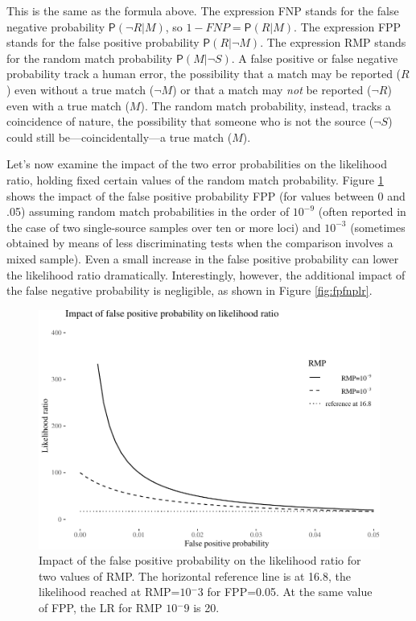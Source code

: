 \documentclass[
  10pt,
  dvipsnames,enabledeprecatedfontcommands]{scrartcl}
\newcommand{\n}{\neg}
\newcommand{\pr}[1]{\mathsf{P}(#1)}
\begin{document}
\noindent This is the same as the formula above. The expression FNP
stands for the false negative probability \(\pr{\neg R \vert M}\), so
\(1-FNP=\pr{R \vert M}\). The expression FPP stands for the false
positive probability \(\pr{R \vert \n M}\). The expression RMP stands
for the random match probability \(\pr{M\vert \n S}\). A false positive
or false negative probability track a human error, the possibility that
a match may be reported (\(R\)) even without a true match (\(\neg M\))
or that a match may \textit{not} be reported (\(\neg R\)) even with a
true match (\(M\)). The random match probability, instead, tracks a
coincidence of nature, the possibility that someone who is not the
source (\(\neg S\)) could still be---coincidentally---a true match
(\(M\)).

Let's now examine the impact of the two error probabilities on the
likelihood ratio, holding fixed certain values of the random match
probability. Figure \ref{fig:fpplr} shows the impact of the false
positive probability FPP (for values between 0 and .05) assuming random
match probabilities in the order of \(10^{-9}\) (often reported in the
case of two single-source samples over ten or more loci) and \(10^{-3}\)
(sometimes obtained by means of less discriminating tests when the
comparison involves a mixed sample). Even a small increase in the false
positive probability can lower the likelihood ratio dramatically.
Interestingly, however, the additional impact of the false negative
probability is negligible, as shown in Figure \ref{fig:fpfnplr}.

\begin{figure}

\begin{center}\includegraphics[width=1\linewidth]{lr-chapter4_files/figure-latex/fig-fpplr-1} \end{center}
\caption{Impact of the false positive probability on the likelihood ratio for two values of RMP. The horizontal reference line is at 16.8, the likelihood reached at RMP=$10{^-3}$ for FPP=0.05. At the same value of FPP, the LR for RMP $10{^-9}$ is 20.}
\label{fig:fpplr}
\end{figure}
\end{document}
